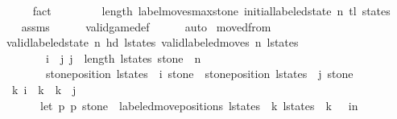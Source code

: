 \begin{isabellebody}
\ \ \ \ \ \ \isamarkupfalse%
\ fact\isanewline
\ \ \isamarkupfalse%
\isanewline
{}\isamarkupfalse%
\isanewline
\ \ \isamarkupfalse%
\ {\isachardoublequoteopen}{}\ {\isasymle}\ length\ {\isacharparenleft}label{\isacharunderscore}moves{\isacharunderscore}max{\isacharunderscore}stone\ {\isacharparenleft}initial{\isacharunderscore}labeled{\isacharunderscore}state\ n{\isacharparenright}\ {\isacharparenleft}tl\ states{\isacharparenright}{\isacharparenright}{\isachardoublequoteclose}\isanewline
\ \ \ \ \isamarkupfalse%
\ assms\isanewline
\ \ \ \ \isamarkupfalse%
\ valid{\isacharunderscore}game{\isacharunderscore}def\isanewline
\ \ \ \ \isamarkupfalse%
\ auto\isanewline
{}\isamarkupfalse%
%
\endisatagproof
{\isafoldproof}%
%
\isadelimproof
%
\endisadelimproof
%
\isadelimdocument
%
\endisadelimdocument
%
\isatagdocument
%
\isamarkuptrue%
%
\endisatagdocument
{\isafolddocument}%
%
\isadelimdocument
%
\endisadelimdocument
{}\isamarkupfalse%
\ moved{\isacharunderscore}from{\isacharcolon}\isanewline
\ \ \ {\isachardoublequoteopen}valid{\isacharunderscore}labeled{\isacharunderscore}state\ n\ {\isacharparenleft}hd\ l{\isacharunderscore}states{\isacharparenright}{\isachardoublequoteclose}\ {\isachardoublequoteopen}valid{\isacharunderscore}labeled{\isacharunderscore}moves\ n\ l{\isacharunderscore}states{\isachardoublequoteclose}\isanewline
\ \ \ \ \ \ \ \ \ \ {\isachardoublequoteopen}i\ {\isacharless}\ j{\isachardoublequoteclose}\ {\isachardoublequoteopen}j\ {\isacharless}\ length\ l{\isacharunderscore}states{\isachardoublequoteclose}\ {\isachardoublequoteopen}stone\ {\isacharless}\ n{\isachardoublequoteclose}\isanewline
\ \ \ \ \ \ \ \ \ \ {\isachardoublequoteopen}stone{\isacharunderscore}position\ {\isacharparenleft}l{\isacharunderscore}states\ {\isacharbang}\ i{\isacharparenright}\ stone\ {\isasymnoteq}\ stone{\isacharunderscore}position\ {\isacharparenleft}l{\isacharunderscore}states\ {\isacharbang}\ j{\isacharparenright}\ stone{\isachardoublequoteclose}\isanewline
\ \ \ {\isachardoublequoteopen}{\isacharparenleft}{\isasymexists}\ k{\isachardot}\ i\ {\isasymle}\ k\ {\isasymand}\ k\ {\isacharless}\ j\ {\isasymand}\ \isanewline
\ \ \ \ \ \ \ \ \ {\isacharparenleft}let\ {\isacharparenleft}p{}{\isacharcomma}\ p{}{\isacharcomma}\ stone{\isacharprime}{\isacharparenright}\ {\isacharequal}\ labeled{\isacharunderscore}move{\isacharunderscore}positions\ {\isacharparenleft}l{\isacharunderscore}states\ {\isacharbang}\ k{\isacharparenright}\ {\isacharparenleft}l{\isacharunderscore}states\ {\isacharbang}\ {\isacharparenleft}k\ {\isacharplus}\ {}{\isacharparenright}{\isacharparenright}\ in\ \isanewline

\end{isabellebody}
